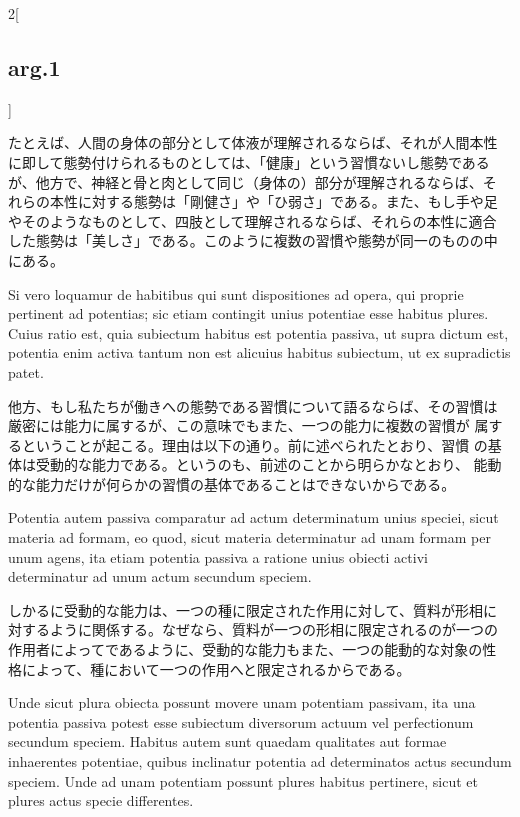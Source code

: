 \documentclass[paper=a4paper,fontsize=10pt,jafontsize=9pt,titlepage]{jlreq}
\begin{document}
\begin{paracol}{2}[\subsection{arg.1}]
\switchcolumn

たとえば、人間の身体の部分として体液が理解されるならば、それが人間本性
に即して態勢付けられるものとしては、「健康」という習慣ないし態勢である
が、他方で、神経と骨と肉として同じ（身体の）部分が理解されるならば、そ
れらの本性に対する態勢は「剛健さ」や「ひ弱さ」である。また、もし手や足
やそのようなものとして、四肢として理解されるならば、それらの本性に適合
した態勢は「美しさ」である。このように複数の習慣や態勢が同一のものの中
にある。

\switchcolumn*

Si vero loquamur de habitibus qui sunt dispositiones ad opera, qui
proprie pertinent ad potentias; sic etiam contingit unius potentiae
esse habitus plures. Cuius ratio est, quia subiectum habitus est
potentia passiva, ut supra dictum est, potentia enim activa tantum non
est alicuius habitus subiectum, ut ex supradictis patet.

\switchcolumn

他方、もし私たちが働きへの態勢である習慣について語るならば、その習慣は
厳密には能力に属するが、この意味でもまた、一つの能力に複数の習慣が
属するということが起こる。理由は以下の通り。前に述べられたとおり、習慣
の基体は受動的な能力である。というのも、前述のことから明らかなとおり、
能動的な能力だけが何らかの習慣の基体であることはできないからである。

\switchcolumn*

Potentia autem passiva comparatur ad actum determinatum unius speciei,
sicut materia ad formam, eo quod, sicut materia determinatur ad unam
formam per unum agens, ita etiam potentia passiva a ratione unius
obiecti activi determinatur ad unum actum secundum speciem.

\switchcolumn

しかるに受動的な能力は、一つの種に限定された作用に対して、質料が形相に
対するように関係する。なぜなら、質料が一つの形相に限定されるのが一つの
作用者によってであるように、受動的な能力もまた、一つの能動的な対象の性
格によって、種において一つの作用へと限定されるからである。

\switchcolumn*

Unde sicut plura obiecta possunt movere unam potentiam passivam, ita
una potentia passiva potest esse subiectum diversorum actuum vel
perfectionum secundum speciem. Habitus autem sunt quaedam qualitates
aut formae inhaerentes potentiae, quibus inclinatur potentia ad
determinatos actus secundum speciem. Unde ad unam potentiam possunt
plures habitus pertinere, sicut et plures actus specie differentes.


\end{paracol}
\end{document}
